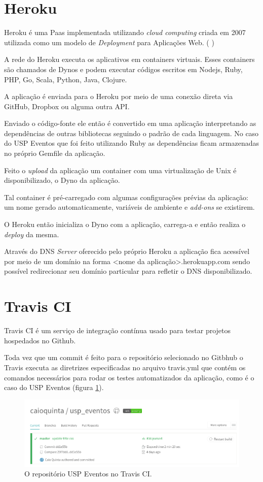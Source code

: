 \section{Heroku}
\par Heroku é uma Paas implementada utilizando \emph{cloud computing} criada em 2007 utilizada como um modelo de \emph{Deployment} para Aplicações Web. ( \cite{herokuwiki})
\par A rede do Heroku executa os aplicativos em containers virtuais. Esses containers são chamados de Dynos e podem executar códigos escritos em Nodejs, Ruby, PHP, Go, Scala, Python, Java, Clojure.
\par A aplicação é enviada para o Heroku por meio de uma conexão direta via GitHub, Dropbox ou alguma outra API.
\par Enviado o código-fonte ele então é convertido em uma aplicação interpretando as dependências de outras bibliotecas seguindo o padrão de cada linguagem. No caso do USP Eventos que foi feito utilizando Ruby as dependências ficam armazenadas no próprio Gemfile da aplicação.
\par Feito o \emph{upload} da aplicação um container com uma virtualização de Unix é disponibilizado, o Dyno da aplicação.
\par Tal container é pré-carregado com algumas configurações prévias da aplicação: um nome gerado automaticamente, variáveis de ambiente e \emph{add-ons} se existirem.
\par O Heroku então inicializa o Dyno com a aplicação, carrega-a e então realiza o \emph{deploy} da mesma.
\par Através do DNS \emph{Server} oferecido pelo próprio Heroku a aplicação fica acessível por meio de um domínio na forma <nome da aplicação>.herokuapp.com sendo possível redirecionar seu domínio particular para refletir o DNS disponibilizado.
\section{Travis CI}
\par Travis CI é um serviço de integração contínua usado para testar projetos hospedados no Github.
\par Toda vez que um commit é feito para o repositório selecionado no Gitbhub o Travis executa as diretrizes especificadas no arquivo travis.yml que contém os comandos necessários para rodar os testes automatizados da aplicação, como é o caso do USP Eventos (figura \ref{fig:travis}).
\begin{figure}[htb]
\centering
\includegraphics[width=15cm]{figuras/travis}
\caption{\label{fig:travis} O repositório USP Eventos no Travis CI.}
\end{figure}

